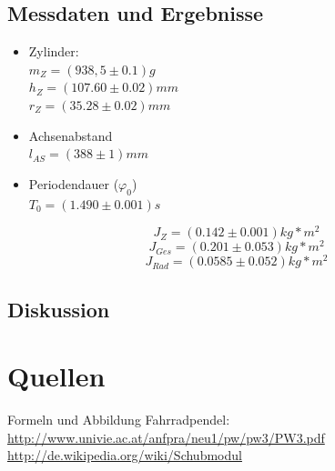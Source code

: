 \documentclass[12pt,a4paper]{article}
\begin{document}
\begin{multicols}{2}
\subsection{Messdaten und Ergebnisse}
\begin{itemize}
	\item Zylinder:\\
	$m_{Z}= (938,5 \pm 0.1)g$\\
	$h_{Z} = (107.60 \pm 0.02)mm$\\
	$r_{Z}=(35.28 \pm 0.02)mm$\\
	
	\item Achsenabstand\\
	$l_{AS}=(388\pm 1)mm$\\
	
	\item Periodendauer ($\varphi_{0}$)\\
	$T_{0}= (1.490 \pm 0.001)s$\\
	
\end{itemize}


$$J_{Z}= (0.142 \pm 0.001)kg*m^2$$
$$J_{Ges}= (0.201\pm 0.053)kg*m^2$$
$$J_{Rad}= (0.0585 \pm 0.052)kg*m^2$$


\subsection{Diskussion}



\section{Quellen}
Formeln und Abbildung Fahrradpendel:\\
\url{http://www.univie.ac.at/anfpra/neu1/pw/pw3/PW3.pdf}\\
\url{http://de.wikipedia.org/wiki/Schubmodul}\\
\\

\end{multicols}
\end{document}
